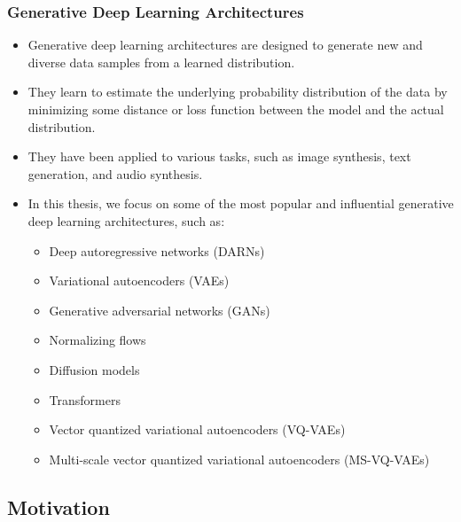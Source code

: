 \begin{frame}
    \frametitle{Generative Deep Learning Architectures}
    \begin{itemize}
        \item Generative deep learning architectures are designed to generate new and diverse data samples from a learned distribution.
        \item They learn to estimate the underlying probability distribution of the data by minimizing some distance or loss function between the model and the actual distribution. 
        \item They have been applied to various tasks, such as image synthesis, text generation, and audio synthesis.
        \item In this thesis, we focus on some of the most popular and influential generative deep learning architectures, such as:
        \begin{itemize}
            \item Deep autoregressive networks (DARNs) 
            \item Variational autoencoders (VAEs) 
            \item Generative adversarial networks (GANs) 
            \item Normalizing flows 
            \item Diffusion models 
            \item Transformers 
            \item Vector quantized variational autoencoders (VQ-VAEs) 
            \item Multi-scale vector quantized variational autoencoders (MS-VQ-VAEs)
        \end{itemize}
    \end{itemize}
\end{frame}

\subsection{Motivation}

